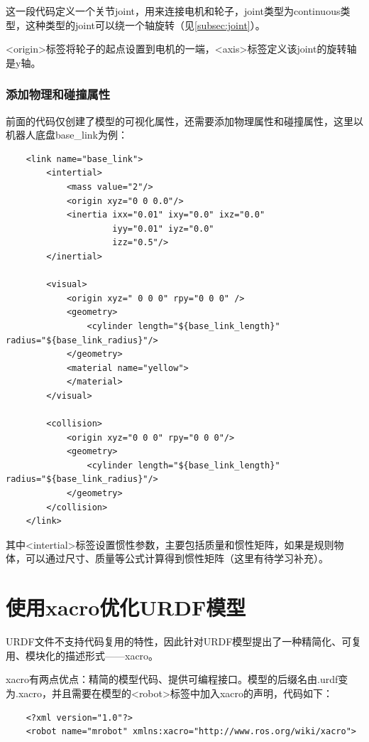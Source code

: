 \documentclass[9pt, oneside]{book}
\begin{document}
这一段代码定义一个关节joint，用来连接电机和轮子，joint类型为continuous类型，这种类型的joint可以绕一个轴旋转（见\autoref{subsec:joint}）。

<origin>标签将轮子的起点设置到电机的一端，<axis>标签定义该joint的旋转轴是y轴。

\subsubsection{添加物理和碰撞属性}

前面的代码仅创建了模型的可视化属性，还需要添加物理属性和碰撞属性，这里以机器人底盘base\_link为例：

\begin{verbatim}
    <link name="base_link">
        <intertial>
            <mass value="2"/>
            <origin xyz="0 0 0.0"/>
            <inertia ixx="0.01" ixy="0.0" ixz="0.0"
                     iyy="0.01" iyz="0.0" 
                     izz="0.5"/>
        </inertial>

        <visual>
            <origin xyz=" 0 0 0" rpy="0 0 0" />
            <geometry>
                <cylinder length="${base_link_length}" radius="${base_link_radius}"/>
            </geometry>
            <material name="yellow">
            </material>
        </visual>

        <collision>
            <origin xyz="0 0 0" rpy="0 0 0"/>
            <geometry>
                <cylinder length="${base_link_length}" radius="${base_link_radius}"/>
            </geometry>
        </collision>
    </link>
\end{verbatim}

其中<intertial>标签设置惯性参数，主要包括质量和惯性矩阵，如果是规则物体，可以通过尺寸、质量等公式计算得到惯性矩阵（这里有待学习补充）。

\section{使用xacro优化URDF模型}

URDF文件不支持代码复用的特性，因此针对URDF模型提出了一种精简化、可复用、模块化的描述形式——xacro。

xacro有两点优点：精简的模型代码、提供可编程接口。模型的后缀名由.urdf变为.xacro，并且需要在模型的<robot>标签中加入xacro的声明，代码如下：

\begin{verbatim}
    <?xml version="1.0"?>
    <robot name="mrobot" xmlns:xacro="http://www.ros.org/wiki/xacro">
\end{verbatim}
\end{document}
